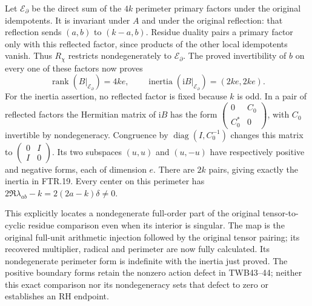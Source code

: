 Let $\mathcal E_{\partial}$ be the direct sum of the $4k$ perimeter
primary factors under the original idempotents. It is invariant
under $A$ and under the original reflection: that reflection sends
$(a,b)$ to $(k-a,b)$. Residue duality pairs a primary factor only
with this reflected factor, since products of the other local
idempotents vanish. Thus $R_\chi$ restricts nondegenerately to
$\mathcal E_{\partial}$. The proved invertibility of $b$ on every
one of these factors now proves
\[
 \operatorname{rank}(B|_{\mathcal E_{\partial}})=4ke,
 \qquad
 \operatorname{inertia}(\mathrm iB|_{\mathcal E_{\partial}})
                         =(2ke,2ke).
 \tag{FTR.19}
\]
For the inertia assertion, no reflected factor is fixed because
$k$ is odd. In a pair of reflected factors the Hermitian matrix
of $\mathrm iB$ has the form
$\left(\begin{smallmatrix}0&C_0\\C_0^*&0\end{smallmatrix}\right)$,
with $C_0$ invertible by nondegeneracy. Congruence by
$\operatorname{diag}(I,C_0^{-1})$ changes this matrix to
$\left(\begin{smallmatrix}0&I\\I&0\end{smallmatrix}\right)$.
Its two subspaces $(u,u)$ and $(u,-u)$ have respectively positive
and negative forms, each of dimension $e$. There are $2k$ pairs,
giving exactly the inertia in FTR.19. Every center on this perimeter
has $2\Re\lambda_{ab}-k=2(2a-k)\delta\ne0$.

This explicitly locates a nondegenerate full-order part of the
original tensor-to-cyclic residue comparison even when its interior
is singular. The map is the original full-unit arithmetic injection
followed by the original tensor pairing; its recovered multiplier,
radical and perimeter are now fully calculated. Its nondegenerate
perimeter form is indefinite with the inertia just proved. The
positive boundary forms retain the nonzero action defect in TWB43--44;
neither this exact comparison nor its nondegeneracy sets that defect
to zero or establishes an RH endpoint.
